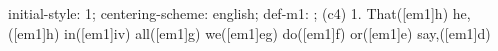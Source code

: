 initial-style: 1;
centering-scheme: english;
def-m1: \grealign;
(c4) 1. That([em1]h) he,([em1]h) in([em1]iv) all([em1]g) we([em1]eg) do([em1]f) or([em1]e) say,([em1]d)